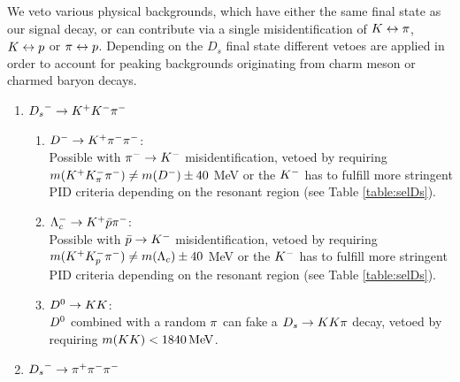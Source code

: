 We veto various physical backgrounds, which have either the same final state as our signal decay, or can contribute via a single misidentification of ${K} \leftrightarrow {\ensuremath{\pi}}$, ${K}\leftrightarrow{\ensuremath{p}}$ or $\pi \leftrightarrow{\ensuremath{p}}$. 
Depending on the $D_s$ final state different vetoes are applied in order to account for peaking backgrounds originating from charm meson or charmed baryon decays.
\begin{enumerate}

\item ${{D}_{s}}^-\rightarrow{\ensuremath{K}}^+{K}^-{\pi}^-$

\begin{enumerate}
	\item ${{D}^-} \rightarrow{\ensuremath{{K}^+}}{\ensuremath{{\pi}^-}}{\ensuremath{{\pi}^-}}$: \\
	Possible with ${{\pi}^-}\rightarrow{\ensuremath{{K}^-}}$ misidentification, vetoed by requiring 
	$m({{K}^+} K^-_\pi {\ensuremath{{\pi}^-}}) \ne m(D^-) \pm 40$ MeV 
	or the ${{K}^-}$ has to fulfill more stringent PID criteria depending on the resonant region (see Table  \ref{table:selDs}).
	
	\item $\Lambda_c^- \rightarrow {\ensuremath{{K}^+}} \bar p {{\pi}^-} $:  \\
	Possible with $\bar p \rightarrow{\ensuremath{{K}^-}}$ misidentification, vetoed by requiring
	$m({{K}^+} K^-_p {{\pi}^-}) \ne m(\Lambda_c) \pm 40$ MeV
	or the ${{K}^-}$ has to fulfill more stringent PID criteria depending on the resonant region (see Table  \ref{table:selDs}).
	
	\item ${{D}^0}\rightarrow{\ensuremath{K}}{\ensuremath{K}}$: \\
	${{D}^0}$ combined with a random ${\pi}$ can fake a ${{D}_{s}}\rightarrow{\ensuremath{K}}{\ensuremath{K}}{\ensuremath{\pi}}$ decay, 
	vetoed by requiring $m({K}{K}) <  1840 \mathrm{\,Me\kern -0.1em V}$. 
\end{enumerate}

\item ${{D}_{s}}^-\rightarrow{\ensuremath{\pi}}^+{\pi}^-{\pi}^-$

\begin{enumerate}




\end{enumerate}
\end{enumerate}
